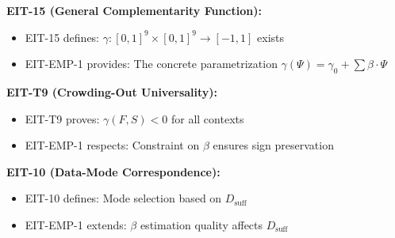 \begin{tcolorbox}[colback=purple!5!white, colframe=purple!75!black,
    title=\textbf{Relationship to Existing EIT Components}]

\textbf{EIT-15 (General Complementarity Function):}
\begin{itemize}[nosep]
    \item EIT-15 defines: $\gamma: [0,1]^9 \times [0,1]^9 \rightarrow [-1,1]$ exists
    \item EIT-EMP-1 provides: The concrete parametrization $\gamma(\Psi) = \gamma_0 + \sum \beta \cdot \Psi$
\end{itemize}

\textbf{EIT-T9 (Crowding-Out Universality):}
\begin{itemize}[nosep]
    \item EIT-T9 proves: $\gamma(F,S) < 0$ for all contexts
    \item EIT-EMP-1 respects: Constraint on $\beta$ ensures sign preservation
\end{itemize}

\textbf{EIT-10 (Data-Mode Correspondence):}
\begin{itemize}[nosep]
    \item EIT-10 defines: Mode selection based on $D_{\text{suff}}$
    \item EIT-EMP-1 extends: $\beta$ estimation quality affects $D_{\text{suff}}$
\end{itemize}

\end{tcolorbox}

